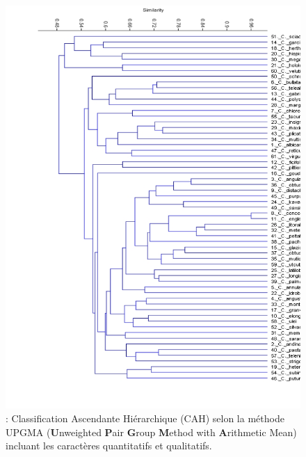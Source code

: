 \documentclass[a4paper]{article}
\theoremstyle{definition}
\theoremstyle{definition}
\theoremstyle{definition}
\theoremstyle{remark}
\begin{document}
\begin{figure}[H]

{\centering \includegraphics[width=1\linewidth]{figure/fig10a} 

}

\caption{: Classification Ascendante Hiérarchique (CAH) selon la
méthode UPGMA (\textbf{U}nweighted \textbf{P}air \textbf{G}roup
\textbf{M}ethod with \textbf{A}rithmetic Mean) incluant les caractères
quantitatifs et qualitatifs.}\label{fig:fig10a}
\end{figure}
\end{document}
